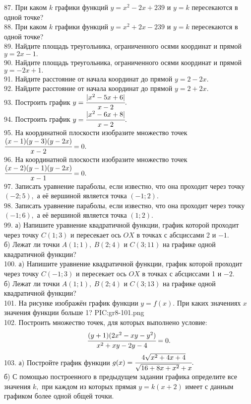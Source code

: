 87. При каком $k$ графики функций $y=x^2-2x+239$ и $y=k$ пересекаются в одной точке?\\
88. При каком $k$ графики функций $y=x^2+2x-239$ и $y=k$ пересекаются в одной точке?\\
89. Найдите площадь треугольника, ограниченного осями координат и прямой $y=2x-1.$\\
90. Найдите площадь треугольника, ограниченного осями координат и прямой $y=-2x+1.$\\
91. Найдите расстояние от начала координат до прямой $y=2-2x.$\\
92. Найдите расстояние от начала координат до прямой $y=2+2x.$\\
93. Построить график $y=\cfrac{|x^2-5x+6|}{x-2}.$\\
94. Построить график $y=\cfrac{|x^2-6x+8|}{x-2}.$\\
95. На координатной плоскости изобразите множество точек $\cfrac{(x-1)(y-3)(y-2x)}{x-2}=0.$\\
96. На координатной плоскости изобразите множество точек $\cfrac{(x-2)(y-1)(y-2x)}{x-1}=0.$\\
97. Записать уравнение параболы, если известно, что она проходит через точку $(-2;5),$ а её вершиной является точка $(-1;2).$\\
98. Записать уравнение параболы, если известно, что она проходит через точку $(-1;6),$ а её вершиной является точка $(1;2).$\\
99. а) Напишите уравнение квадратичной функции, график которой проходит через точку $C(1;3)$ и пересекает ось $OX$ в точках с абсциссами 2 и $-1.$\\
б) Лежат ли точки $A(1;1),\ B(2;4)$ и $C(3;11)$ на графике одной квадратичной функции?\\
100. а) Напишите уравнение квадратичной функции, график которой проходит через точку $C(-1;3)$ и пересекает ось $OX$ в точках с абсциссами 1 и $-2.$\\
б) Лежат ли точки $A(1;1),\ B(2;4)$ и $C(3;13)$ на графике одной квадратичной функции?\\
101. На рисунке изображён график функции $y=f(x).$ При каких значениях $x$ значения функции больше 1?
{{PIC:gr8-101.png}}\\
102. Построить множество точек, для которых выполнено условие:
$$\cfrac{(y+1)(2x^2-xy-y^2)}{x^2+xy-2y-4}=0.$$
103. а) Постройте график функции $g(x)=\cfrac{4\sqrt{x^2+4x+4}}{\sqrt{16+8x+x^2}+x}.$\\
б) С помощью построенного в предыдущем задании графика определите все значения $k,$ при каждом из которых прямая $y=k(x+2)$ имеет с данным графиком более одной общей точки.\\
